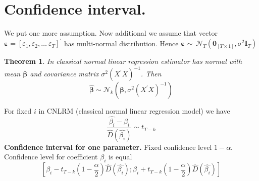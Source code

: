 \documentclass{book}
\newtheorem{theorem}{Theorem}[section]
\begin{document}
\section{Confidence interval.}
We put one more assumption. Now additional we assume that vector $\pmb{\varepsilon}=[\varepsilon_{1},\varepsilon_{2},\dots\ \varepsilon_{T}]^{'}$  has multi-normal distribution. Hence $\pmb{\varepsilon}\sim\ \mathcal{N}_{T}(\mathbf{0}_{[T\times 1]},\sigma^{2}\mathbf{I}_{T})$
\begin{theorem}
In classical normal linear regression estimator has normal with mean $\pmb{\beta}$ and covariance matrix $\sigma^{2}(X^{'}X)^{-1}$. Then
\begin{equation}
\nonumber
\pmb{\hat{\beta}}\sim\mathcal{N}_{k}(\pmb{\beta},\sigma^{2}(X^{'}X)^{-1})
\end{equation}
\end{theorem}
For fixed $i$ in CNLRM (classical normal linear regression model) we have
\begin{equation}
\nonumber
\frac{\hat{\beta_{i}}-\beta_{i}}{\hat{D}(\hat{\beta_{i}})}\sim t_{T-k}
\end{equation} 
\textbf{Confidence interval for one parameter.}
Fixed confidence level $1-\alpha$. Confidence level for coefficient $\beta_{i}$ is equal 
\begin{equation}
\nonumber
[\beta_{i}-t_{T-k}(1-\frac{\alpha}{2})\hat{D}(\hat{\beta_{i}});\beta_{i}+t_{T-k}(1-\frac{\alpha}{2})\hat{D}(\hat{\beta_{i}})]
\end{equation}
\end{document}
